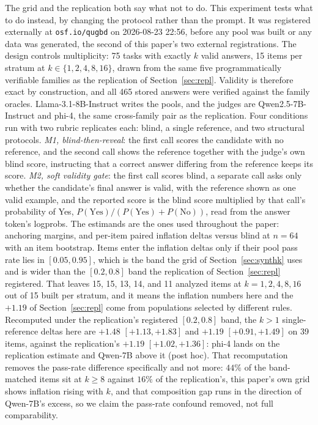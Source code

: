 \documentclass[11pt]{article}
\begin{document}
The grid and the replication both say what not to do.
This experiment tests what to do instead, by changing the protocol rather than the prompt.
It was registered externally at \texttt{osf.io/qugbd} on 2026-08-23 22:56, before any pool was built or any data was generated, the second of this paper's two external registrations.
The design controls multiplicity: 75 tasks with exactly $k$ valid answers, 15 items per stratum at $k \in \{1, 2, 4, 8, 16\}$, drawn from the same five programmatically verifiable families as the replication of Section~\ref{sec:repl}.
Validity is therefore exact by construction, and all 465 stored answers were verified against the family oracles.
Llama-3.1-8B-Instruct writes the pools, and the judges are Qwen2.5-7B-Instruct and phi-4, the same cross-family pair as the replication.
Four conditions run with two rubric replicates each: blind, a single reference, and two structural protocols.
\emph{M1, blind-then-reveal}: the first call scores the candidate with no reference, and the second call shows the reference together with the judge's own blind score, instructing that a correct answer differing from the reference keeps its score.
\emph{M2, soft validity gate}: the first call scores blind, a separate call asks only whether the candidate's final answer is valid, with the reference shown as one valid example, and the reported score is the blind score multiplied by that call's probability of Yes, $P(\text{Yes})/(P(\text{Yes}) + P(\text{No}))$, read from the answer token's logprobs.
The estimands are the ones used throughout the paper: anchoring margins, and per-item paired inflation deltas versus blind at $n{=}64$ with an item bootstrap.
Items enter the inflation deltas only if their pool pass rate lies in $[0.05, 0.95]$, which is the band the grid of Section~\ref{sec:synthk} uses and is wider than the $[0.2, 0.8]$ band the replication of Section~\ref{sec:repl} registered.
That leaves 15, 15, 13, 14, and 11 analyzed items at $k{=}1, 2, 4, 8, 16$ out of 15 built per stratum, and it means the inflation numbers here and the $+1.19$ of Section~\ref{sec:repl} come from populations selected by different rules.
Recomputed under the replication's registered $[0.2, 0.8]$ band, the $k{>}1$ single-reference deltas here are $+1.48$ $[+1.13, +1.83]$ and $+1.19$ $[+0.91, +1.49]$ on 39 items, against the replication's $+1.19$ $[+1.02, +1.36]$: phi-4 lands on the replication estimate and Qwen-7B above it (post hoc).
That recomputation removes the pass-rate difference specifically and not more: $44\%$ of the band-matched items sit at $k \geq 8$ against $16\%$ of the replication's, this paper's own grid shows inflation rising with $k$, and that composition gap runs in the direction of Qwen-7B's excess, so we claim the pass-rate confound removed, not full comparability.
\end{document}
